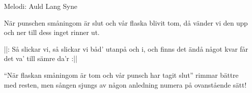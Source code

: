 \begin{song}

\begin{songmeta}
Melodi: Auld Lang Syne
\end{songmeta}

\begin{songtext}
När punschen småningom är slut
och vår flaska blivit tom,
då vänder vi den upp och ner
till dess inget rinner ut.

||: Så slickar vi, så slickar vi
båd' utanpå och i,
och finns det ändå något kvar
får det va' till sämre da'r :||
\end{songtext}

\begin{songnotes}
\textquotedblleft{}När flaskan småningom är tom och vår punsch har tagit slut\textquotedblright{} rimmar bättre med resten, men sången sjungs av någon anledning numera på ovanstående sätt!
\end{songnotes}

\end{song}
